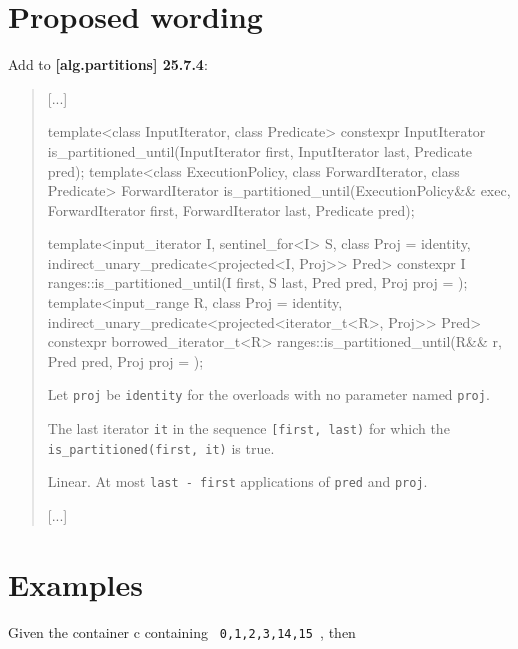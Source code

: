 \documentclass{wg21}
\newcommand{\cc}[1]{\texttt{#1}}
\begin{document}
\section{Proposed wording}
Add to \textbf{[alg.partitions] 25.7.4}:
\begin{quote}
[...]	
\begin{itemdecl}
template<class InputIterator, class Predicate>
  constexpr InputIterator is_partitioned_until(InputIterator first, InputIterator last,
                                               Predicate pred);
template<class ExecutionPolicy, class ForwardIterator, class Predicate>
  ForwardIterator is_partitioned_until(ExecutionPolicy&& exec, ForwardIterator first,
                                       ForwardIterator last, Predicate pred);
\end{itemdecl}

\begin{itemdecl}
template<input_iterator I, sentinel_for<I> S, class Proj = identity,
         indirect_unary_predicate<projected<I, Proj>> Pred>
  constexpr I ranges::is_partitioned_until(I first, S last, Pred pred,
                                           Proj proj = {});	
template<input_range R, class Proj = identity, 
         indirect_unary_predicate<projected<iterator_t<R>, Proj>> Pred>
  constexpr borrowed_iterator_t<R> ranges::is_partitioned_until(R&& r, Pred pred,
                                                                Proj proj = {});
\end{itemdecl} 
\begin{itemdescr}
Let \cc{proj} be \cc{identity{}} for the overloads with no parameter named \cc{proj}.	
	
\returns The last iterator \cc{it} in the sequence \cc{[first, last)} for which the \cc{is_partitioned(first, it)} is true.

\complexity Linear. At most \cc{last - first} applications of \cc{pred} and \cc{proj}.
\end{itemdescr}    
[...]
\end{quote}

\section{Examples}
Given the container c containing \cc{ 0,1,2,3,14,15 }, then
\begin{quote}
\end{quote}
\end{document}

